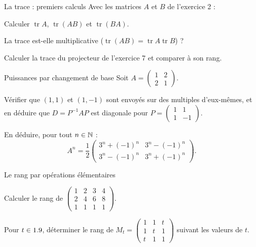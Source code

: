 \begin{exercice}[1]{La trace : premiers calculs}
Avec les matrices $A$ et $B$ de l'exercice 2 :
\begin{questions}
  \item Calculer $\operatorname{tr}A$, $\operatorname{tr}(AB)$ et
    $\operatorname{tr}(BA)$.
  \item La trace est-elle multiplicative
    ($\operatorname{tr}(AB)=\operatorname{tr}A\operatorname{tr}B$) ?
  \item Calculer la trace du projecteur de l'exercice 7 et comparer à son
    rang.
\end{questions}
\end{exercice}


\begin{exercice}[2]{Puissances par changement de base}
Soit $A=\begin{pmatrix}1&2\\2&1\end{pmatrix}$.
\begin{questions}
  \item Vérifier que $(1,1)$ et $(1,-1)$ sont envoyés sur des multiples
    d'eux-mêmes, et en déduire que $D=P^{-1}AP$ est diagonale pour
    $P=\begin{pmatrix}1&1\\1&-1\end{pmatrix}$.
  \item En déduire, pour tout $n\in\mathbb{N}$ :
    \[
    A^{n}=\frac12\begin{pmatrix}3^{n}+(-1)^{n}&3^{n}-(-1)^{n}\\
    3^{n}-(-1)^{n}&3^{n}+(-1)^{n}\end{pmatrix}.
    \]
\end{questions}
\end{exercice}

\begin{exercice}[2]{Le rang par opérations élémentaires}
\begin{questions}
  \item Calculer le rang de
    $\begin{pmatrix}1&2&3&4\\2&4&6&8\\1&1&1&1\end{pmatrix}$.
  \item Pour $t\in1.9$, déterminer le rang de
    $M_t=\begin{pmatrix}1&1&t\\1&t&1\\t&1&1\end{pmatrix}$ suivant les
    valeurs de $t$.
\end{questions}
\end{exercice}

